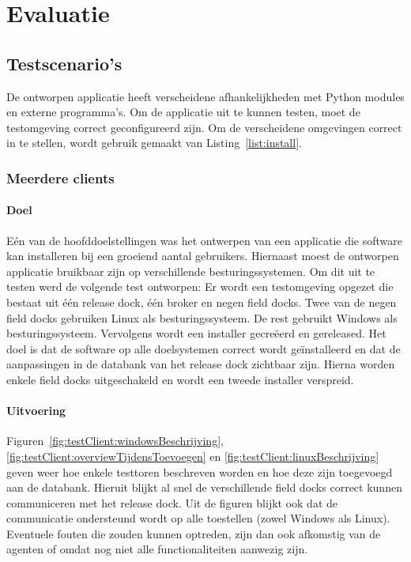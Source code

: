 \chapter{Evaluatie}
\section{Testscenario's}
De ontworpen applicatie heeft verscheidene afhankelijkheden met Python modules en externe programma's.
Om de applicatie uit te kunnen testen, moet de testomgeving correct geconfigureerd zijn.
Om de verscheidene omgevingen correct in te stellen, wordt gebruik gemaakt van Listing~\ref{list:install}.

\subsection{Meerdere clients}
\subsubsection{Doel}
Eén van de hoofddoelstellingen was het ontwerpen van een applicatie die software kan installeren bij een groeiend aantal gebruikers.
Hiernaast moest de ontworpen applicatie bruikbaar zijn op verschillende besturingssystemen.
Om dit uit te testen werd de volgende test ontworpen:
Er wordt een testomgeving opgezet die bestaat uit één release dock, één broker en negen field docks.
Twee van de negen field docks gebruiken Linux als besturingssysteem.
De rest gebruikt Windows als besturingssysteem.
Vervolgens wordt een installer gecreëerd en gereleased.
Het doel is dat de software op alle doelsystemen correct wordt geïnstalleerd en dat de aanpassingen in de databank van het release dock zichtbaar zijn.
Hierna worden enkele field docks uitgeschakeld en wordt een tweede installer verspreid.

\subsubsection{Uitvoering}
Figuren~\ref{fig:testClient:windowsBeschrijving}, \ref{fig:testClient:overviewTijdensToevoegen} en \ref{fig:testClient:linuxBeschrijving} geven weer hoe enkele testtoren beschreven worden en hoe deze zijn toegevoegd aan de databank.
Hieruit blijkt al snel de verschillende field docks correct kunnen communiceren met het release dock.
Uit de figuren blijkt ook dat de communicatie ondersteund wordt op alle toestellen (zowel Windows als Linux).
Eventuele fouten die zouden kunnen optreden, zijn dan ook afkomstig van de agenten of omdat nog niet alle functionaliteiten aanwezig zijn.

